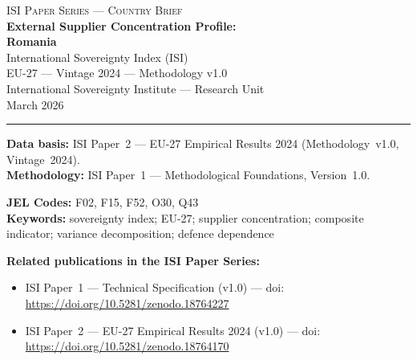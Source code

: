 \documentclass[12pt,a4paper]{article}
\begin{document}
\hypersetup{pageanchor=false}

\begin{titlepage}
\centering
\vspace*{2cm}
{\Large\textsc{ISI Paper Series --- Country Brief}}\\[1.2cm]
{\LARGE\bfseries External Supplier Concentration Profile:\\[0.3em]
Romania}\\[1.5cm]
{\large International Sovereignty Index (ISI)\\[0.3em]
EU-27 --- Vintage 2024 --- Methodology v1.0}\\[1.2cm]
{\large International Sovereignty Institute --- Research Unit}\\[0.8cm]
{\large March 2026}

\vspace{0.8cm}
\noindent\rule{\textwidth}{0.4pt}
\vspace{0.4cm}

\begin{flushleft}
\noindent\textbf{Data basis:} ISI Paper~2 --- EU-27 Empirical Results 2024 (Methodology~v1.0, Vintage~2024).\\[4pt]
\noindent\textbf{Methodology:} ISI Paper~1 --- Methodological Foundations, Version~1.0.

\medskip

\noindent\textbf{JEL Codes:} F02, F15, F52, O30, Q43\\[4pt]
\noindent\textbf{Keywords:} sovereignty index; EU-27; supplier concentration; composite indicator; variance decomposition; defence dependence

\medskip

\noindent\textbf{Related publications in the ISI Paper Series:}
\begin{itemize}[nosep,leftmargin=1.5em]
\item ISI Paper~1 --- Technical Specification (v1.0) --- doi:\\
  \url{https://doi.org/10.5281/zenodo.18764227}
\item ISI Paper~2 --- EU-27 Empirical Results 2024 (v1.0) --- doi:\\
  \url{https://doi.org/10.5281/zenodo.18764170}
\end{itemize}
\end{flushleft}
\vfill
\end{titlepage}
\end{document}

